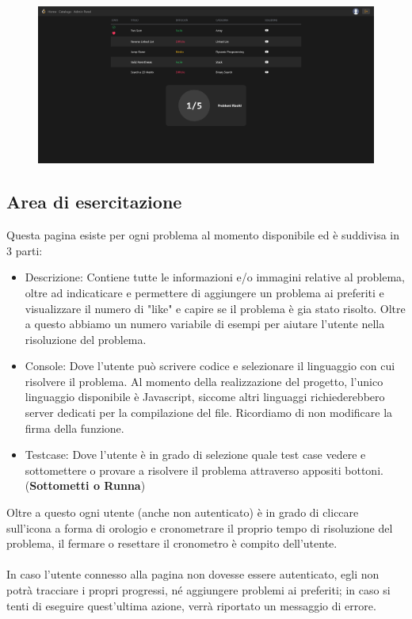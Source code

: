 \documentclass[11pt, a4paper]{article}
\theoremstyle{definition}
\begin{document}
\begin{figure}[H]
  \centering
  \includegraphics[width=\textwidth]{materiale/sito/Catalogo.png}
\end{figure}

\subsection{Area di esercitazione}
Questa pagina esiste per ogni problema al momento disponibile ed è suddivisa in 3 parti:
\begin{itemize}
  \item Descrizione: Contiene tutte le informazioni e/o immagini relative al problema, oltre ad indicaticare e permettere di aggiungere un problema ai preferiti e visualizzare il numero di "like" e capire se il problema è gia stato risolto. Oltre a questo abbiamo un numero variabile di esempi per aiutare l'utente nella risoluzione del problema.
  \item Console: Dove l'utente può scrivere codice e selezionare il linguaggio con cui risolvere il problema. Al momento della realizzazione del progetto, l'unico linguaggio disponibile è Javascript, siccome altri linguaggi richiederebbero server dedicati per la compilazione del file. Ricordiamo di non modificare la firma della funzione.
  \item Testcase: Dove l'utente è in grado di selezione quale test case vedere e sottomettere o provare a risolvere il problema attraverso appositi bottoni. (\textbf{Sottometti o Runna})
\end{itemize}
Oltre a questo ogni utente (anche non autenticato) è in grado di cliccare sull'icona a forma di orologio e cronometrare il proprio tempo di risoluzione del problema, il fermare o resettare il cronometro è compito dell'utente.
\\\\
In caso l'utente connesso alla pagina non dovesse essere autenticato, egli non potrà tracciare i propri progressi, né aggiungere problemi ai preferiti; in caso si tenti di eseguire quest'ultima azione, verrà riportato un messaggio di errore.
\\\\
\end{document}
